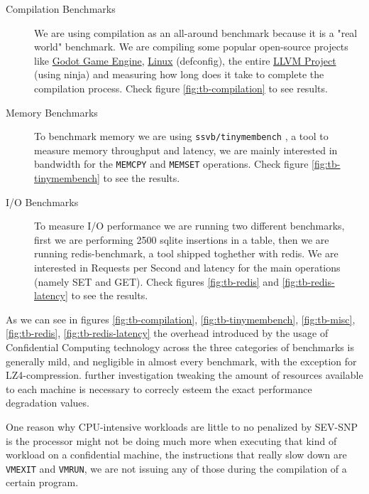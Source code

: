 \documentclass[twocolumn]{article}
\begin{document}
\begin{description}
    \item[Compilation Benchmarks] We are using compilation as an all-around benchmark because it is a "real world" benchmark. We are compiling some popular open-source projects like \href{https://github.com/godotengine/godot}{Godot Game Engine}, \href{https://git.kernel.org/pub/scm/linux/kernel/git/torvalds/linux.git}{Linux} (defconfig), the entire \href{https://github.com/llvm/llvm-project}{LLVM Project} (using ninja) and measuring how long does it take to complete the compilation process. Check figure \ref{fig:tb-compilation} to see results.
    \item[Memory Benchmarks] To benchmark memory we are using \texttt{ssvb/tinymembench} \cite{tinymembench}, a tool to measure memory throughput and latency, we are mainly interested in bandwidth for the \texttt{MEMCPY} and \texttt{MEMSET} operations. Check figure \ref{fig:tb-tinymembench} to see the results.
    \item[I/O Benchmarks] To measure I/O performance we are running two different benchmarks, first we are performing 2500 sqlite insertions in a table, then we are running redis-benchmark, a tool shipped toghether with redis. We are interested in Requests per Second and latency for the main operations (namely SET and GET). Check figures \ref{fig:tb-redis} and \ref{fig:tb-redis-latency} to see the results.
\end{description}

As we can see in figures \ref{fig:tb-compilation}, \ref{fig:tb-tinymembench}, \ref{fig:tb-misc}, \ref{fig:tb-redis}, \ref{fig:tb-redis-latency} the overhead introduced by the usage of Confidential Computing technology across the three categories of benchmarks is generally mild, and negligible in almost every benchmark, with the exception for LZ4-compression. further investigation tweaking the amount of resources available to each machine is necessary to correcly esteem the exact performance degradation values.

One reason why CPU-intensive workloads are little to no penalized by SEV-SNP is the processor might not be doing much more when executing that kind of workload on a confidential machine, the instructions that really slow down are \texttt{VMEXIT} and \texttt{VMRUN}, we are not issuing any of those during the compilation of a certain program.
\end{document}
